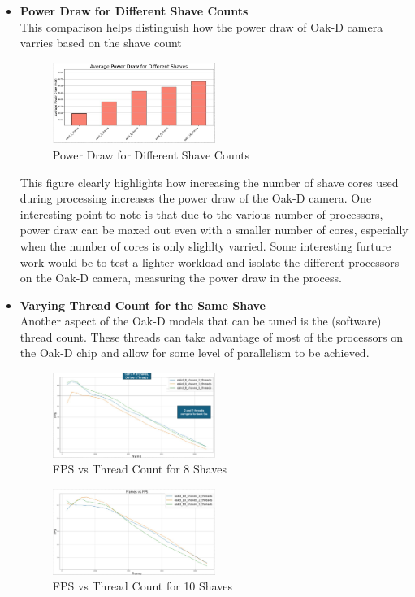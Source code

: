 \documentclass[sigconf,authorversion,nonacm]{acmart}
\begin{document}
\begin{itemize}
    \item \textbf{Power Draw for Different Shave Counts} \\ This comparison helps distinguish how the power draw of Oak-D camera varries based on the shave count
    
    \begin{figure}[h] %
        \centering
        \includegraphics[width=0.5\textwidth]{figures/power-draw-shave.png}
        \caption{Power Draw for Different Shave Counts}
        \label{fig:your_label}
    \end{figure}

    This figure clearly highlights how increasing the number of shave cores used during processing increases the power draw of the Oak-D camera. One interesting point to note is that due to the various number of processors, power draw can be maxed out even with a smaller number of cores, especially when the number of cores is only slighlty varried. Some interesting furture work would be to test a lighter workload and isolate the different processors on the Oak-D camera, measuring the power draw in the process.

    \item \textbf{Varying Thread Count for the Same Shave} \\Another aspect of the Oak-D models that can be tuned is the (software) thread count. These threads can take advantage of most of the processors on the Oak-D chip and allow for some level of parallelism to be achieved.
    \begin{figure}[h] %
        \centering
        \includegraphics[width=0.5\textwidth]{figures/same-shave-thread-8.png}
        \caption{FPS vs Thread Count for 8 Shaves}
        \label{fig:your_label}
    \end{figure}
    \begin{figure}[h] %
        \centering
        \includegraphics[width=0.5\textwidth]{figures/same-shave-thread-10.png}
        \caption{FPS vs Thread Count for 10 Shaves}
        \label{fig:your_label}
    \end{figure}


\end{itemize}
\end{document}
